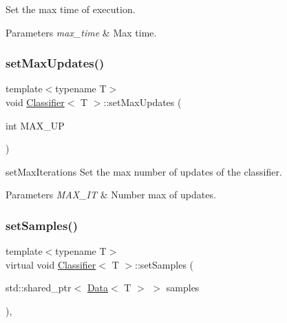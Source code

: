 Set the max time of execution. 


\begin{DoxyParams}{Parameters}
{\em max\+\_\+time} & Max time. \\
\hline
\end{DoxyParams}
\mbox{\label{class_classifier_a343905df8798ef1e29983d4582a1cdb6}} 
\subsubsection{\texorpdfstring{set\+Max\+Updates()}{setMaxUpdates()}}
{\footnotesize\ttfamily template$<$typename T$>$ \\
void \mbox{\hyperlink{class_classifier}{Classifier}}$<$ T $>$\+::set\+Max\+Updates (\begin{DoxyParamCaption}\item[{int}]{M\+A\+X\+\_\+\+UP }\end{DoxyParamCaption})\hspace{0.3cm}{\ttfamily [inline]}}



set\+Max\+Iterations Set the max number of updates of the classifier. 


\begin{DoxyParams}{Parameters}
{\em M\+A\+X\+\_\+\+IT} & Number max of updates. \\
\hline
\end{DoxyParams}
\mbox{\label{class_classifier_ad32dac7fcf649c5642c39f2ea22f3fde}} 
\subsubsection{\texorpdfstring{set\+Samples()}{setSamples()}}
{\footnotesize\ttfamily template$<$typename T$>$ \\
virtual void \mbox{\hyperlink{class_classifier}{Classifier}}$<$ T $>$\+::set\+Samples (\begin{DoxyParamCaption}\item[{std\+::shared\+\_\+ptr$<$ \mbox{\hyperlink{class_data}{Data}}$<$ T $>$ $>$}]{samples }\end{DoxyParamCaption})\hspace{0.3cm}{\ttfamily [inline]}, {\ttfamily [virtual]}}



